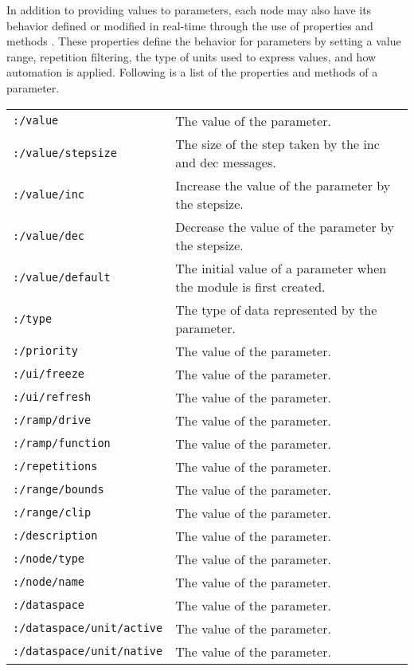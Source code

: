 \documentclass{article}
\begin{document}
In addition to providing values to parameters, each node may also have its behavior defined or modified in real-time through the use of properties and methods \cite{Place:2008}.  These properties define the behavior for parameters by setting a value range, repetition filtering, the type of units used to express values, and how automation is applied.  Following is a list of the properties and methods of a parameter.

\begin{tabular}{ll}
	\texttt{:/value} & The value of the parameter. \\
	\texttt{:/value/stepsize} & The size of the step taken by the inc and dec messages. \\
	\texttt{:/value/inc} & Increase the value of the parameter by the stepsize. \\
	\texttt{:/value/dec} & Decrease the value of the parameter by the stepsize. \\
	\texttt{:/value/default} & The initial value of a parameter when the module is first created. \\
	\texttt{:/type} & The type of data represented by the parameter. \\
	\texttt{:/priority} & The value of the parameter. \\
	\texttt{:/ui/freeze} & The value of the parameter. \\
	\texttt{:/ui/refresh} & The value of the parameter. \\
	\texttt{:/ramp/drive} & The value of the parameter. \\
	\texttt{:/ramp/function} & The value of the parameter. \\
	\texttt{:/repetitions} & The value of the parameter. \\
	\texttt{:/range/bounds} & The value of the parameter. \\
	\texttt{:/range/clip} & The value of the parameter. \\
	\texttt{:/description} & The value of the parameter. \\
	\texttt{:/node/type} & The value of the parameter. \\
	\texttt{:/node/name} & The value of the parameter. \\
	\texttt{:/dataspace} & The value of the parameter. \\
	\texttt{:/dataspace/unit/active} & The value of the parameter. \\
	\texttt{:/dataspace/unit/native} & The value of the parameter. \\
\end{tabular}
\end{document}
